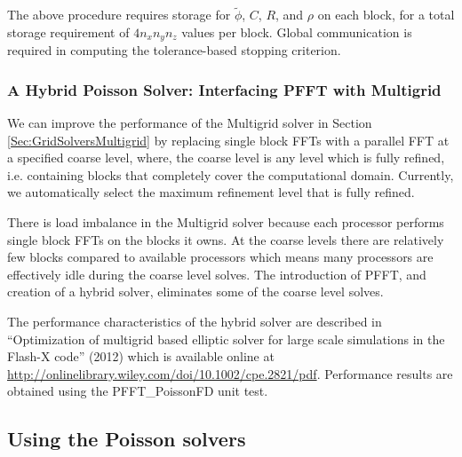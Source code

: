 The above procedure requires storage for $\tilde\phi$, $C$, $R$, and $\rho$ on
each block, for a total storage requirement of $4 n_x n_y n_z$ values per
block. Global communication is required in computing the tolerance-based
stopping criterion.


\subsubsection{A Hybrid Poisson Solver: Interfacing PFFT with Multigrid}
\label{PFFTMultigrid}
We can improve the performance of the Multigrid solver in Section
\ref{Sec:GridSolversMultigrid} by replacing single block FFTs with a
parallel FFT at a specified coarse level, where, the coarse level is
any level which is fully refined, i.e. containing blocks that
completely cover the computational domain.  Currently, we
automatically select the maximum refinement level that is fully
refined.

There is load imbalance in the Multigrid solver because each processor
performs single block FFTs on the blocks it owns.  At the coarse
levels there are relatively few blocks compared to available
processors which means many processors are effectively idle during the
coarse level solves.  The introduction of PFFT, and creation of a
hybrid solver, eliminates some of the coarse level solves.


The performance characteristics of the hybrid solver are described in
``Optimization of multigrid based elliptic solver for large scale
simulations in the Flash-X code'' (2012) which is available online at
\url{http://onlinelibrary.wiley.com/doi/10.1002/cpe.2821/pdf}.
Performance results are obtained using the PFFT\_PoissonFD unit test.



\subsection{Using the Poisson solvers}

